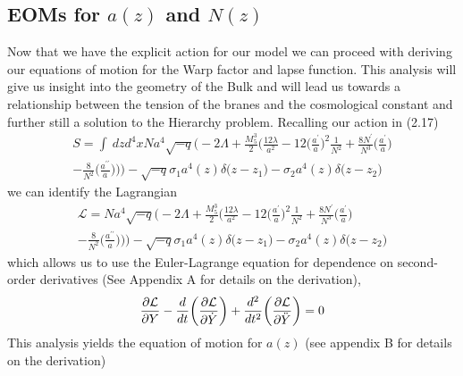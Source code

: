 \documentclass[11pt]{report}
\numberwithin{equation}{chapter}
\begin{document}
\subsection{EOMs for $a(z)$ and $N(z)$}
Now that we have the explicit action for our model we can proceed with deriving our equations of motion for the Warp factor and lapse function. This analysis will give us insight into the geometry of the Bulk and will lead us towards a relationship between the tension of the branes and the cosmological constant and further still a solution to the Hierarchy problem. Recalling our action in (2.17)
\begin{multline}
    S=\int\ dzd^4xNa^4\sqrt {-q}\bigg(-2\Lambda+\frac{M^3_5}{2}\bigg(\frac{12\lambda}{a^2}-12\bigg(\frac{a^\prime}{a}\bigg)^2\frac{1}{N^2}+\frac{8N^\prime}{N^3}\bigg(\frac{a^\prime}{a}\bigg)\\ -\frac{8}{N^2}\bigg(\frac{a^{\prime\prime}}{a}\bigg)\bigg)\bigg)-\sqrt{-q}\sigma_1a^4(z)\delta\big(z-z_1\big)-\sigma_2a^4(z)\delta\big(z-z_2\big)
\end{multline}
we can identify the Lagrangian
\begin{multline}
    \mathcal{L}=Na^4\sqrt {-q}\bigg(-2\Lambda+\frac{M^3_5}{2}\bigg(\frac{12\lambda}{a^2}-12\bigg(\frac{a^\prime}{a}\bigg)^2\frac{1}{N^2}+\frac{8N^\prime}{N^3}\bigg(\frac{a^\prime}{a}\bigg)\\-\frac{8}{N^2}\bigg(\frac{a^{\prime\prime}}{a}\bigg)\bigg)\bigg)-\sqrt{-q}\sigma_1a^4(z)\delta\big(z-z_1\big)-\sigma_2a^4(z)\delta\big(z-z_2\big)
\end{multline}
which allows us to use the Euler-Lagrange equation for dependence on second-order derivatives (See Appendix A for details on the derivation),
\begin{equation}
    \frac{\partial\mathcal{L}}{\partial Y}-\frac{d}{dt}\bigg(\frac{\partial\mathcal{L}}{\partial \Dot{Y}}\bigg)+\frac{d^2}{dt^2}\bigg(\frac{\partial\mathcal{L}}{\partial \Ddot{Y}}\bigg)=0
\end{equation}
 This analysis yields the equation of motion for $a(z)$ (see appendix B for details on the derivation)
\end{document}
